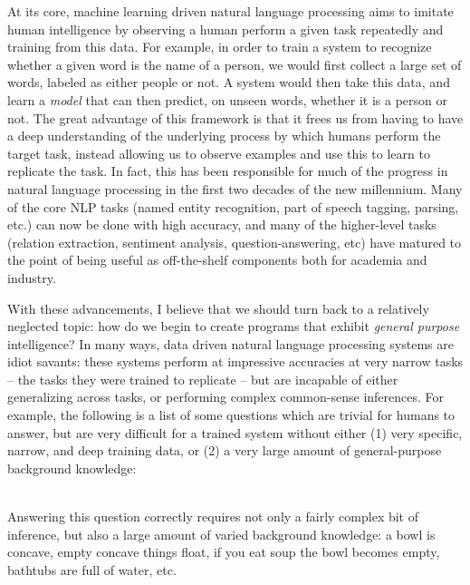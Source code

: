 
%
%
At its core, machine learning driven natural language processing aims to imitate human intelligence by
  observing a human perform a given task repeatedly and training from this data.
For example, in order to train a system to recognize whether a given word is the name of a person,
  we would first collect a large set of words, labeled as either people or not.
A system would then take this data, and learn a \textit{model} that can then predict, on unseen
  words, whether it is a person or not.
The great advantage of this framework is that it frees us from having to have a deep understanding of
  the underlying process by which humans perform the target task, instead allowing us to observe
  examples and use this to learn to replicate the task.
In fact, this has been responsible for much of the progress in natural language processing in
  the first two decades of the new millennium.
Many of the core NLP tasks (named entity recognition, part of speech tagging, parsing, etc.)
  can now be done with high accuracy,
  and many of the higher-level tasks (relation extraction, sentiment analysis, question-answering, etc)
  have matured to the point of being useful as off-the-shelf components both for academia and industry.

With these advancements, I believe that we should turn back to a relatively neglected
  topic: how do we begin to create programs that exhibit \textit{general purpose} intelligence?
In many ways, data driven natural language processing systems are idiot savants:
  these systems perform at impressive accuracies at very narrow tasks -- the tasks they were trained
  to replicate -- but are incapable of either generalizing across tasks, or performing complex
  common-sense inferences.
For example, the following is a list of some questions which are trivial for humans to answer, 
  but are very difficult
  for a trained system without either (1) very specific, narrow, and deep training data, or (2) a very large
  amount of general-purpose background knowledge:

\begin{displayquote}
   \\
  Answering this question correctly requires not only a fairly complex bit of inference, but also
    a large amount of varied background knowledge: a bowl is concave, empty concave things float,
    if you eat soup the bowl becomes empty, bathtubs are full of water, etc.
\end{displayquote}

